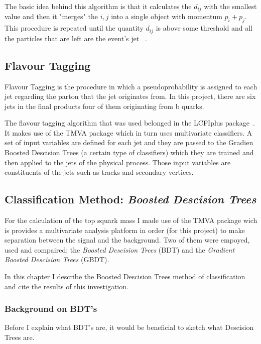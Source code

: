 \documentclass[12pt,a4paper]{report}
\begin{document}
The basic idea behind this algorithm is that it calculates the $d_{ij}$ with the smallest value and then it 
"merges" the $i,j$ into a single object with momentum $p_{i}+p_{j}$. This procedure is repeated until the quantity
$d_{ij}$ is above some threshold and all the particles that are left are the event's jet
~\cite{cacciari2012fastjet}.

\subsection{Flavour Tagging}

Flavour Tagging is the procedure in which a pseudoprobability is assigned to each jet regarding the parton
that the jet originates from. In this project, there are six jets in the final products four of them 
originating from b quarks. 

The flavour tagging algorithm that was used belonged in the LCFIplus package~\cite{suehara2016lcfiplus}.
It  makes use of the TMVA package which in turn uses multivariate classifiers. A set of input variables are 
defined for each jet and they are passed to the Gradien Boosted Descision Trees (a certain type of classifiers)
which they are trained and then applied to the jets of the physical process. Those input variables are
constituents of the jets such as tracks and secondary vertices.

\subsection{Classification Method: \textit{Boosted Descision Trees}}

For the calculation of the top squark mass I made use of the TMVA package wich is provides a multivariate 
analysis platform in order (for this project) to make separation between the signal and the background. Two 
of them were empoyed, used and compaired: the \textit{Boosted Descision Trees} (BDT) and the 
\textit{Gradient Boosted Descision Trees} (GBDT).

In this chapter I describe the Boosted Descision Trees method of classification and cite the results of this 
investigation.

\subsubsection{Background on BDT's}

Before I explain what BDT's are, it would be beneficial to sketch what Descision Trees are. 
\end{document}
